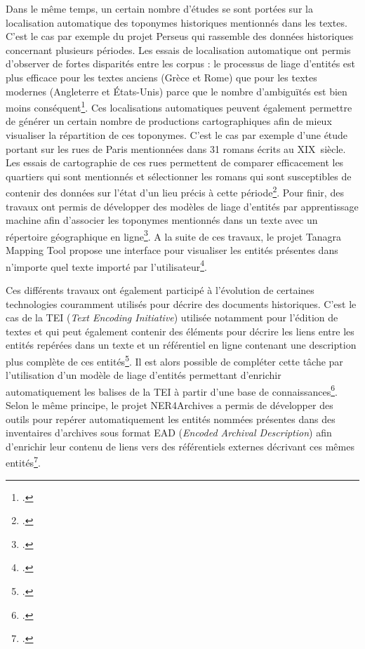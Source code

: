\documentclass[a4paper,12pt,twoside]{book}
\begin{document}
	Dans le même temps, un certain nombre d'études se sont portées sur la localisation automatique des toponymes historiques mentionnés dans les textes. C'est le cas par exemple du projet Perseus qui rassemble des données historiques concernant plusieurs périodes. Les essais de localisation automatique ont permis d'observer de fortes disparités entre les corpus : le processus de liage d'entités est plus efficace pour les textes anciens (Grèce et Rome) que pour les textes modernes (Angleterre et États-Unis) parce que le nombre d'ambiguïtés est bien moins conséquent\footcite{goos_disambiguating_2001}. Ces localisations automatiques peuvent également permettre de générer un certain nombre de productions cartographiques afin de mieux visualiser la répartition de ces toponymes. C'est le cas par exemple d'une étude portant sur les rues de Paris mentionnées dans 31 romans écrits au XIX\ieme\ siècle. Les essais de cartographie de ces rues permettent de comparer efficacement les quartiers qui sont mentionnés et sélectionner les romans qui sont susceptibles de contenir des données sur l'état d'un lieu précis à cette période\footcite{boeglin_pour_2016}. Pour finir, des travaux ont permis de développer des modèles de liage d'entités par apprentissage machine afin d'associer les toponymes mentionnés dans un texte avec un répertoire géographique en ligne\footcite{santos_toponym_2018}. A la suite de ces travaux, le projet Tanagra Mapping Tool propose une interface pour visualiser les entités présentes dans n'importe quel texte importé par l'utilisateur\footcite{noauthor_location_nodate}.
	
	Ces différents travaux ont également participé à l'évolution de certaines technologies couramment utilisés pour décrire des documents historiques. C'est le cas de la TEI (\textit{Text Encoding Initiative}) utilisée notamment pour l'édition de textes et qui peut également contenir des éléments pour décrire les liens entre les entités repérées dans un texte et un référentiel en ligne contenant une description plus complète de ces entités\footcite{frontini_annotation_2016}. Il est alors possible de compléter cette tâche par l'utilisation d'un modèle de liage d'entités permettant d'enrichir automatiquement les balises de la TEI à partir d'une base de connaissances\footcite{brando_reden_2016}. Selon le même principe, le projet NER4Archives a permis de développer des outils pour repérer automatiquement les entités nommées présentes dans des inventaires d'archives sous format EAD (\textit{Encoded Archival Description}) afin d'enrichir leur contenu de liens vers des référentiels externes décrivant ces mêmes entités\footcite{clavaud_ner4archives_nodate}.
	
\end{document}
